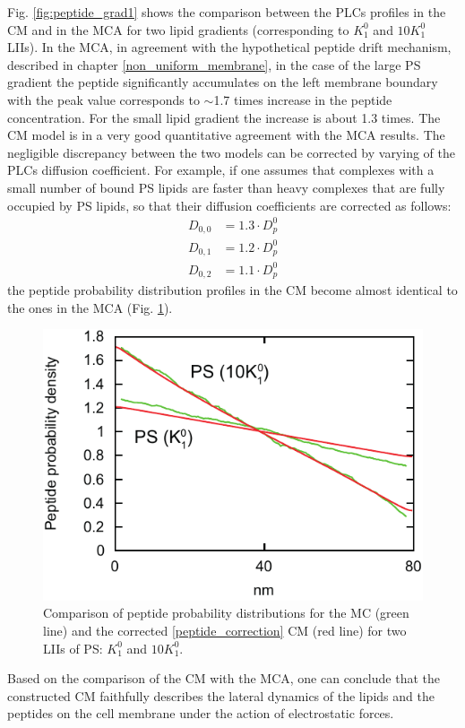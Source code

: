 Fig. \ref{fig:peptide_grad1} shows the comparison between the PLCs profiles in the CM and in the MCA for two lipid gradients (corresponding to $K_1^0$ and $10K_1^0$ LIIs). In the MCA, in agreement with the hypothetical peptide drift mechanism, described in chapter \ref{non_uniform_membrane}, in the case of the large PS gradient the peptide significantly accumulates on the left membrane boundary with the peak value corresponds to $\sim$1.7 times increase in the peptide concentration. For the small lipid gradient the increase is about 1.3 times. The CM model is in a very good quantitative agreement with the MCA results. The negligible discrepancy between the two models can be corrected by varying of the PLCs diffusion coefficient. For example, if one assumes that complexes with a small number of bound PS lipids are faster than heavy complexes that are fully occupied by PS lipids, so that their diffusion coefficients are corrected as follows:
\begin{align}
\label{peptide_correction}
 D_{0,0} &= 1.3\cdot D_p^0 \nonumber \\
 D_{0,1} &= 1.2\cdot D_p^0 \nonumber \\
 D_{0,2} &= 1.1\cdot D_p^0
\end{align}
the peptide probability distribution profiles in the CM become almost identical to the ones in the MCA (Fig. \ref{fig:peptide_grad2}).

\begin{figure}[!ht]
\centering
  \includegraphics[scale=1.03]{../figures/peptide_grad2.pdf}

\caption[Comparison of the corrected CM and MCA for peptide probability distributions]{Comparison of peptide probability distributions for the MC (green line) and the corrected \eqref{peptide_correction} CM (red line) for two LIIs of PS: $K_1^0$ and $10 K_1^0$.}
\label{fig:peptide_grad2}
\end{figure}

Based on the comparison of the CM with the MCA, one can conclude that the constructed CM faithfully describes the lateral dynamics of the lipids and the peptides on the cell membrane under the action of electrostatic forces.
